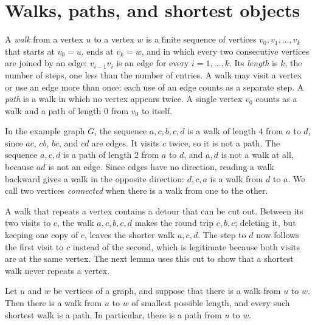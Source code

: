 \section{Walks, paths, and shortest objects}\label{ch07:sec:walks}
A \emph{walk} from a vertex $u$ to a vertex $w$ is a finite sequence of vertices $v_0,v_1,\ldots,v_k$ that starts at $v_0=u$, ends at $v_k=w$, and in which every two consecutive vertices are joined by an edge: $v_{i-1}v_i$ is an edge for every $i=1,\ldots,k$. Its \emph{length} is $k$, the number of steps, one less than the number of entries. A walk may visit a vertex or use an edge more than once; each use of an edge counts as a separate step. A \emph{path} is a walk in which no vertex appears twice. A single vertex $v_0$ counts as a walk and a path of length $0$ from $v_0$ to itself.

In the example graph $G$, the sequence $a,c,b,c,d$ is a walk of length $4$ from $a$ to $d$, since $ac$, $cb$, $bc$, and $cd$ are edges. It visits $c$ twice, so it is not a path. The sequence $a,c,d$ is a path of length $2$ from $a$ to $d$, and $a,d$ is not a walk at all, because $ad$ is not an edge. Since edges have no direction, reading a walk backward gives a walk in the opposite direction: $d,c,a$ is a walk from $d$ to $a$. We call two vertices \emph{connected} when there is a walk from one to the other.

A walk that repeats a vertex contains a detour that can be cut out. Between its two visits to $c$, the walk $a,c,b,c,d$ makes the round trip $c,b,c$; deleting it, but keeping one copy of $c$, leaves the shorter walk $a,c,d$. The step to $d$ now follows the first visit to $c$ instead of the second, which is legitimate because both visits are at the same vertex. The next lemma uses this cut to show that a shortest walk never repeats a vertex.

\par\noindent\begin{minipage}{\linewidth}
\begin{lemma}\label{ch07:lem:shortest-walk}
Let $u$ and $w$ be vertices of a graph, and suppose that there is a walk from $u$ to $w$. Then there is a walk from $u$ to $w$ of smallest possible length, and every such shortest walk is a path. In particular, there is a path from $u$ to $w$.
\end{lemma}
\end{minipage}\par

